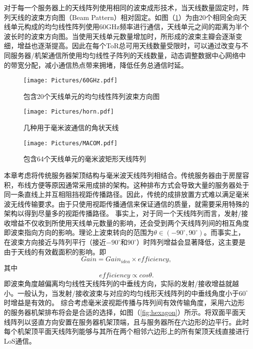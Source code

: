 对于每一个服务器上的天线阵列使用相同的波束成形技术，当天线数量固定时，阵列天线的波束方向图（Beam Pattern）相对固定。如图（\ref{fig:60ghz}）为由20个相同全向天线单元构成的均匀线性阵列使用60GHz频率进行通信，天线单元之间的距离为半个波长时的波束方向图。当使用天线单元数量增加时，所形成的波束主瓣会逐渐变细，增益也逐渐提高。因此在每个ToR总可用天线数量受限时，可以通过改变与不同服务器/机架通信所使用均匀线性子阵列的天线数量，动态调整数据中心网络中的带宽分配，减小通信热点带来拥堵，降低任务总通信时延。

\begin{figure}[htbp]
	\centering
	\texttt{[image: Pictures/60GHz.pdf]}
	\caption{包含20个天线单元的均匀线性阵列波束方向图}
	\label{fig:60ghz}
\end{figure}

\begin{figure}[htbp]
	\centering
	\texttt{[image: Pictures/horn.pdf]}
	\caption{几种用于毫米波通信的角状天线\cite{hornantenna}}
	\label{fig:horn}
\end{figure}

\begin{figure}[htbp]
	\centering
	\texttt{[image: Pictures/MACOM.pdf]}
	\caption{包含64个天线单元的毫米波矩形天线阵列\cite{macom2017}}
	\label{fig:macom}
\end{figure}

本章考虑将传统服务器架顶结构与毫米波天线阵列相结合。传统服务器由于房屋容积，布线方便等原因通常采用成排的架构。这种排布方式会导致大量的服务器处于同一条直线上并互相阻挡视距传播路径。因此，传统的成排放置方式难以满足毫米波无线传输要求。由于只使用视距传播通信来保证通信的质量，就需要采用特殊的架构以得到尽量多的视距传播路径。
事实上，对于同一个天线阵列而言，发射/接收增益不仅收到所使用天线单元数量的影响，还会受到两个天线阵列间的相互角度即波束指向方向的影响。理论上波束转向的范围为$\theta \in (-90^{\circ},90^{\circ})$。而事实上，在波束方向接近与阵列平行（接近$-90^{\circ}$和$90^{\circ}$）时阵列增益会显著降低，这主要是由于天线的有效截面积的影响。即
\begin{equation}
	Gain = Gain_{idea} \times efficiency,
\end{equation}
其中
\begin{equation}
	efficiency \propto cos \theta.
\end{equation}
即波束角度越偏离均匀线性天线阵列的中垂线方向，实际的发射/接收增益就越小\cite{atesal2010x}。一般认为，当发射/接收波束与对应的均匀线形天线阵列的中垂线角度小于$60^{\circ}$时增益是有效的\cite{vardhan2014polycell}。
综合考虑毫米波视距传播与阵列间有效传输角度，采用六边形的服务器机架排布将会是合适的选择，如图（\ref{fig:hexagon}）所示。将双面平面天线阵列以竖直方向安置在服务器机架顶端，且与服务器所在六边形的边平行。此时每个机架顶平面天线阵列能够与其所在两个相邻六边形上的所有架顶天线直接进行LoS通信。


